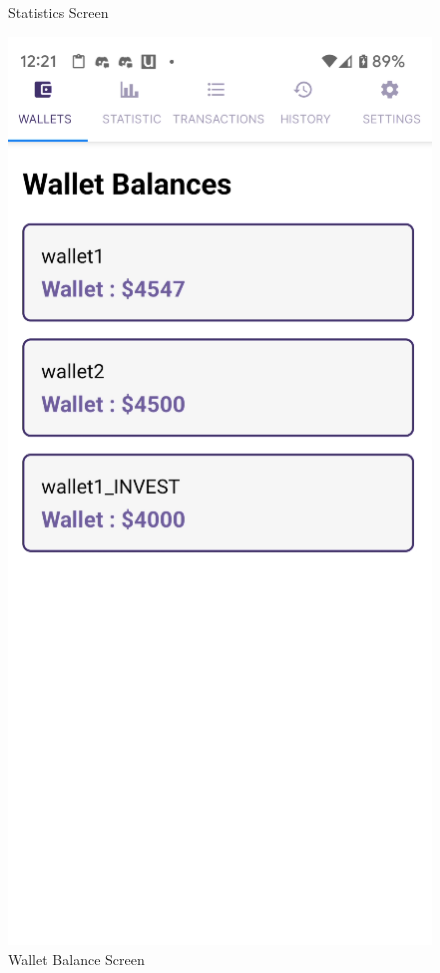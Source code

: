 \begin{figure}[htbp]
\begin{minipage}[t]{0.2\textwidth}
        \caption{Statistics Screen}
        \label{fig:statistics}
    \end{minipage}
    \hfill
    \begin{minipage}[t]{0.2\textwidth}
        \centering
        \includegraphics[width=\textwidth]{Screen Shots/Moneager/WalletBalanceScreen.png}
        \caption{Wallet Balance Screen}
        \label{fig:wallet-balance}
    \end{minipage}
\end{figure}


